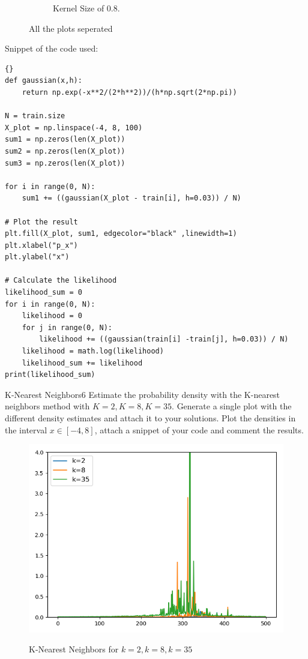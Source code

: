 \begin{questions}
\begin{figure}[H]
\begin{subfigure}[b]{0.3\linewidth}
	\caption{Kernel Size of 0.8.}
	\label{fig:kd03}
\end{subfigure}
	\caption{All the plots seperated}
\end{figure}


Snippet of the code used: 
\begin{lstlisting}{}
def gaussian(x,h):
    return np.exp(-x**2/(2*h**2))/(h*np.sqrt(2*np.pi))  

N = train.size
X_plot = np.linspace(-4, 8, 100)
sum1 = np.zeros(len(X_plot))
sum2 = np.zeros(len(X_plot))
sum3 = np.zeros(len(X_plot))

for i in range(0, N):
    sum1 += ((gaussian(X_plot - train[i], h=0.03)) / N)

# Plot the result
plt.fill(X_plot, sum1, edgecolor="black" ,linewidth=1)
plt.xlabel("p_x")
plt.ylabel("x")

# Calculate the likelihood
likelihood_sum = 0
for i in range(0, N):
    likelihood = 0
    for j in range(0, N):
        likelihood += ((gaussian(train[i] -train[j], h=0.03)) / N)
    likelihood = math.log(likelihood)
    likelihood_sum += likelihood
print(likelihood_sum)
\end{lstlisting}


\begin{question}{K-Nearest Neighbors}{6}
Estimate the probability density with the K-nearest neighbors method with $K=2, K=8, K=35$.
Generate a single plot with the different density estimates and attach it to your solutions. Plot the densities in the interval $x \in [-4,8]$, attach a snippet of your code and comment the results.

\begin{answer}


\end{answer}

\end{question}


\begin{figure}[!h]
	\includegraphics[width=0.62\linewidth]{pictures/knnplot.png}
	\centering
	\label{kd}
	\caption{K-Nearest Neighbors for $k=2, k=8, k=35$}
\end{figure}


\end{questions}
